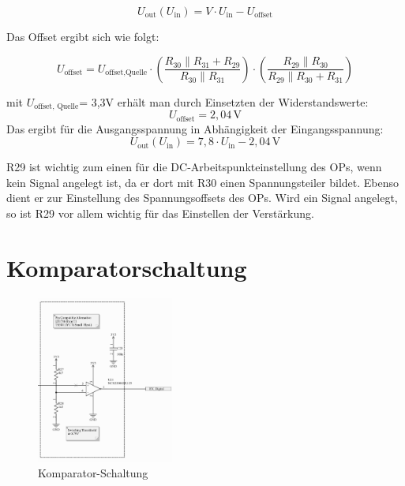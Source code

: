 \begin{equation}
    U_{\text{out}}(U_{\text{in}}) = V \cdot U_{\text{in}} - U_{\text{offset}}
\end{equation}

Das Offset ergibt sich wie folgt:

\begin{equation}
    U_{\text{offset}} = U_{\text{offset,Quelle}} \cdot \left( \frac{R_{30} \parallel R_{31} + R_{29}}{R_{30} \parallel R_{31}} \right) \cdot \left( \frac{R_{29} \parallel R_{30}}{R_{29} \parallel R_{30} + R_{31}} \right)
\end{equation}

mit $U_{\text{offset, Quelle}}$= 3,3V erhält man durch Einsetzten der Widerstandswerte:
\begin{equation}
    U_{\text{offset}} = 2{,}04\,\mathrm{V}
\end{equation}
Das ergibt für die Ausgangsspannung in Abhängigkeit der Eingangsspannung:
\begin{equation}
    U_{\text{out}}(U_{\text{in}}) = 7{,}8 \cdot U_{\text{in}} - 2{,}04\,\mathrm{V}
\end{equation}

\clearpage



R29 ist wichtig zum einen für die DC-Arbeitspunkteinstellung des OPs, wenn kein Signal angelegt ist, da er dort mit R30 einen Spannungsteiler bildet.
Ebenso dient er zur Einstellung des Spannungsoffsets des OPs.
Wird ein Signal angelegt, so ist R29 vor allem wichtig für das Einstellen der Verstärkung.


\section{Komparatorschaltung} %

\begin{figure}[H]
    \centering
    \includegraphics[width=0.4\textwidth]{Pictures/Komparator.png}
    \caption{Komparator-Schaltung}
    \label{fig:opamp_schaltung}
\end{figure}

